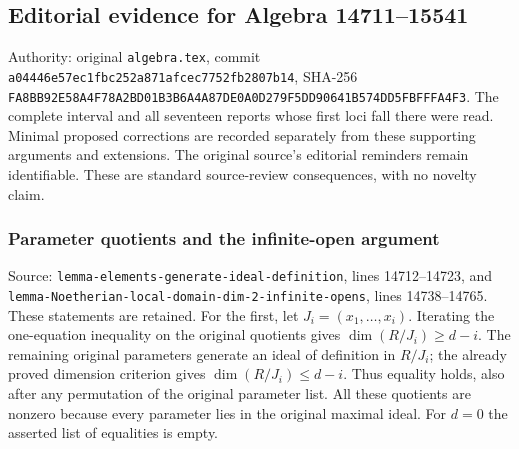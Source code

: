 \subsection{Editorial evidence for Algebra 14711--15541}\label{algebra-proof-004-editorial-evidence-for-algebra-1471115541}

Authority: original \texttt{algebra.tex}, commit \texttt{a044\allowbreak{}46e5\allowbreak{}7ec1\allowbreak{}fbc2\allowbreak{}52a8\allowbreak{}71af\allowbreak{}cec7\allowbreak{}752f\allowbreak{}b280\allowbreak{}7b14}, SHA-256 \texttt{FA8B\allowbreak{}B92E\allowbreak{}58A4\allowbreak{}F78A\allowbreak{}2BD0\allowbreak{}1B3B\allowbreak{}6A4A\allowbreak{}87DE\allowbreak{}0A0D\allowbreak{}279F\allowbreak{}5DD9\allowbreak{}0641\allowbreak{}B574\allowbreak{}DD5F\allowbreak{}BFFF\allowbreak{}A4F3}. The complete interval and all seventeen reports whose first loci fall there were read. Minimal proposed corrections are recorded separately from these supporting arguments and extensions. The original source's editorial reminders remain identifiable. These are standard source-review consequences, with no novelty claim.

\subsubsection{Parameter quotients and the infinite-open argument}\label{algebra-proof-004-parameter-quotients-and-the-infinite-open-argument}

Source: \texttt{lemma-\AlgebraIdentifierBreak{}elements-\AlgebraIdentifierBreak{}generate-\AlgebraIdentifierBreak{}ideal-\AlgebraIdentifierBreak{}definition}, lines 14712--14723, and \texttt{lemma-\AlgebraIdentifierBreak{}Noetherian-\AlgebraIdentifierBreak{}local-\AlgebraIdentifierBreak{}domain-\AlgebraIdentifierBreak{}dim-\AlgebraIdentifierBreak{}2-\AlgebraIdentifierBreak{}infinite-\AlgebraIdentifierBreak{}opens}, lines 14738--14765. These statements are retained. For the first, let \(J_i=(x_1,\ldots,x_i)\). Iterating the one-equation inequality on the original quotients gives \(\dim(R/J_i)\geq d-i\). The remaining original parameters generate an ideal of definition in \(R/J_i\); the already proved dimension criterion gives \(\dim(R/J_i)\leq d-i\). Thus equality holds, also after any permutation of the original parameter list. All these quotients are nonzero because every parameter lies in the original maximal ideal. For \(d=0\) the asserted list of equalities is empty.

